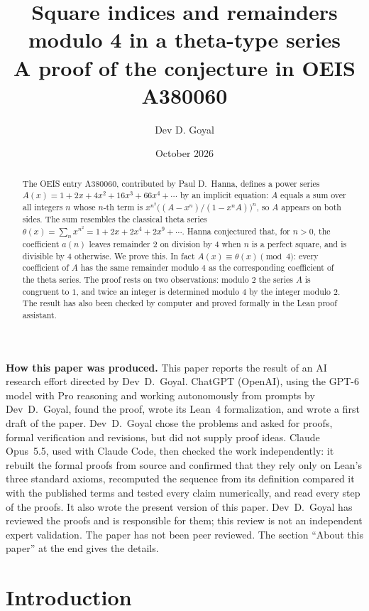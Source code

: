 \documentclass[11pt,a4paper]{article}
\title{Square indices and remainders modulo 4 in a theta-type series\\[6pt]\large A proof of the conjecture in OEIS A380060}
\author{Dev D. Goyal}
\date{October 2026}
\theoremstyle{definition}
\theoremstyle{remark}
\begin{document}
\maketitle
\begin{abstract}
The OEIS entry A380060, contributed by Paul D.~Hanna, defines a power series
$A(x)=1+2x+4x^2+16x^3+66x^4+\cdots$ by an implicit equation: $A$ equals a sum over all integers $n$ whose $n$-th term
is $x^{n^2}\bigl((A-x^n)/(1-x^nA)\bigr)^n$, so $A$ appears on both sides. The sum resembles the classical theta series
$\theta(x)=\sum_nx^{n^2}=1+2x+2x^4+2x^9+\cdots$. Hanna conjectured that, for $n>0$, the coefficient $a(n)$ leaves
remainder $2$ on division by $4$ when $n$ is a perfect square, and is divisible by $4$ otherwise. We prove this. In
fact $A(x)\equiv\theta(x)\pmod 4$: every coefficient of $A$ has the same remainder modulo $4$ as the corresponding
coefficient of the theta series. The proof rests on two observations: modulo $2$ the series $A$ is congruent to $1$,
and twice an integer is determined modulo $4$ by the integer modulo $2$. The result has also been checked by
computer and proved formally in the Lean proof assistant.
\end{abstract}
\begin{center}\begin{minipage}{0.88\linewidth}\small
\textbf{How this paper was produced.} This paper reports the result of an AI research effort directed by
Dev~D.~Goyal. ChatGPT (OpenAI), using the GPT-6 model with Pro reasoning and working autonomously from prompts by
Dev~D.~Goyal, found the proof, wrote its Lean~4 formalization, and wrote a first draft of the paper.
Dev~D.~Goyal chose the problems and asked for proofs, formal verification and revisions, but did not supply proof
ideas. Claude Opus~5.5, used with Claude Code, then checked the work independently: it rebuilt the formal proofs from
source and confirmed that they rely only on Lean's three standard axioms, recomputed the sequence from its definition
compared it with the published terms and tested every claim numerically, and read every step of the proofs. It also wrote the present
version of this paper.
Dev~D.~Goyal has reviewed the proofs and is responsible for them; this review is not an independent expert validation.
The paper has not been peer reviewed.
The section ``About this paper'' at the end gives the details.
\end{minipage}\end{center}

\section{Introduction}
\end{document}
